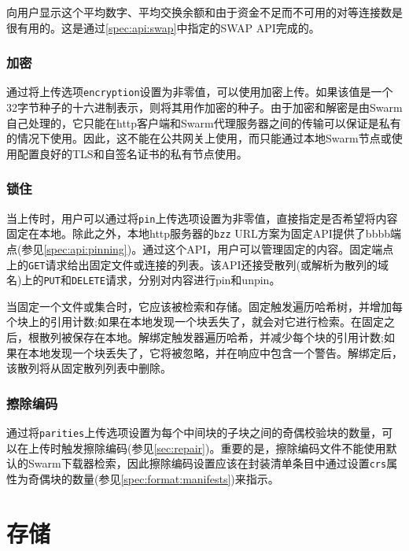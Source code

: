 向用户显示这个平均数字、平均交换余额和由于资金不足而不可用的对等连接数是很有用的。这是通过\ref{spec:api:swap}中指定的SWAP API完成的。

\subsubsection{加密}

通过将上传选项\lstinline{encryption}设置为非零值，可以使用加密上传。如果该值是一个32字节种子的十六进制表示，则将其用作加密的种子。由于加密和解密是由Swarm自己处理的，它只能在http客户端和Swarm代理服务器之间的传输可以保证是私有的情况下使用。因此，这不能在公共网关上使用，而只能通过本地Swarm节点或使用配置良好的TLS和自签名证书的私有节点使用。

\subsubsection{锁住}

当上传时，用户可以通过将\lstinline{pin}上传选项设置为非零值，直接指定是否希望将内容固定在本地。除此之外，本地http服务器的\lstinline{bzz} URL方案为固定API提供了bbbb端点(参见\ref{spec:api:pinning})。通过这个API，用户可以管理固定的内容。固定端点上的\lstinline{GET}请求给出固定文件或连接的列表。该API还接受散列(或解析为散列的域名)上的\lstinline{PUT}和\lstinline{DELETE}请求，分别对内容进行pin和unpin。  

当固定一个文件或集合时，它应该被检索和存储。固定触发遍历哈希树，并增加每个块上的引用计数;如果在本地发现一个块丢失了，就会对它进行检索。在固定之后，根散列被保存在本地。解绑定触发器遍历哈希，并减少每个块的引用计数;如果在本地发现一个块丢失了，它将被忽略，并在响应中包含一个警告。解绑定后，该散列将从固定散列列表中删除。 



\subsubsection{擦除编码}

通过将\lstinline{parities}上传选项设置为每个中间块的子块之间的奇偶校验块的数量，可以在上传时触发擦除编码(参见\ref{sec:repair})。重要的是，擦除编码文件不能使用默认的Swarm下载器检索，因此擦除编码设置应该在封装清单条目中通过设置\lstinline{crs}属性为奇偶块的数量(参见\ref{spec:format:manifests})来指示。 

\section{存储\statusgreen}\label{sec:storage-ux}

